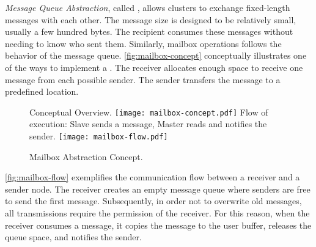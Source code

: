 
			\textit{Message Queue Abstraction}, called \mailbox, allows clusters to exchange
			fixed-length messages with each other. The message size is designed to be
			relatively small, usually a few hundred bytes. The recipient consumes these
			messages without needing to know who sent them. Similarly, mailbox operations
			follows the behavior of the \posix message queue. \autoref{fig:mailbox-concept}
			conceptually illustrates one of the ways to implement a \mailbox. The receiver
			allocates enough space to receive one message from each possible sender.
			The sender transfers the message to a predefined location.

			\begin{figure}[!tb]
				\centering%
				\caption{Mailbox Abstraction Concept.}%
				\label{fig:mailbox}%

					{Conceptual Overview.}%
					{\texttt{[image: mailbox-concept.pdf]}}%
				\hspace{1cm}%
					{Flow of execution: Slave sends a message, Master reads and notifies the sender.}%
					{\texttt{[image: mailbox-flow.pdf]}}%

			\end{figure}

			\autoref{fig:mailbox-flow} exemplifies the communication flow between a
			receiver and a sender node. The receiver creates an empty message queue
			where senders are free to send the first message. Subsequently, in order
			not to overwrite old messages, all transmissions require the permission
			of the receiver. For this reason,  when the receiver consumes a message,
			it copies the message to the user buffer, releases the queue space, and
			notifies the sender.
			
